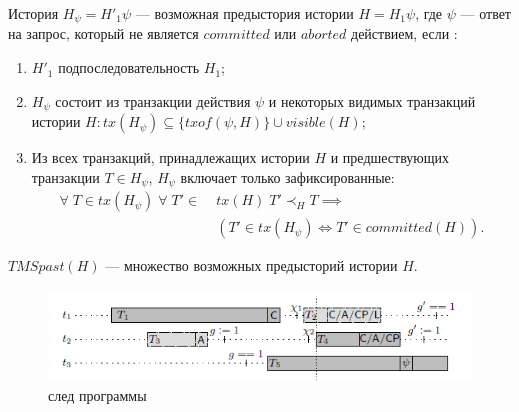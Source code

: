 \begin{mydefinition}\label{possible_past}
История $H_{\psi} = H'_1\psi$ --- возможная предыстория истории $H = H_1\psi$, где $\psi$ --- ответ на запрос, который не является $committed$ или $aborted$ действием, если :
\begin{enumerate}[label = (\roman*)]
\item $H'_1$ подпоследовательность $H_1$;
\item $H_{\psi}$ состоит из транзакции действия $\psi$ и некоторых видимых транзакций истории $H: tx(H_{\psi}) \subseteq \{ txof(\psi, H)\} \cup visible(H)$;
\item Из всех транзакций, принадлежащих истории $H$ и предшествующих транзакции $T\in H_{\psi}$, $H_{\psi}$ включает только зафиксированные:
\begin{align*}
\forall \; T \in tx(H_{\psi}) \; \forall \; T' \in \; &tx(H) \; T' \prec_H T \implies \\ &(T' \in tx(H_{\psi}) \iff T' \in committed(H)).
\end{align*}
\end{enumerate}
$TMSpast(H)$ --- множество возможных предысторий истории $H$.
\end{mydefinition}

\begin{figure}
\centering
\includegraphics[width=\textwidth]{img/trace.png}
\caption{\label{fig:trace} след программы} 
\end{figure}

